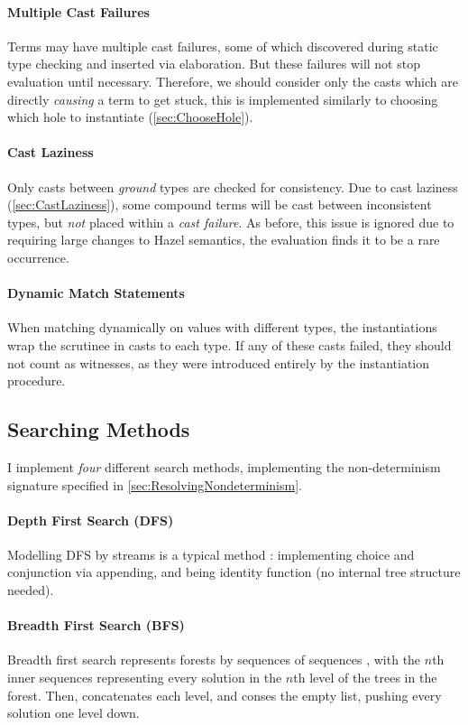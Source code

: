 \paragraph{Multiple Cast Failures} Terms may have multiple cast failures, some of which discovered during static type checking and inserted via elaboration. But these failures will not stop evaluation until necessary. Therefore, we should consider only the casts which are directly \textit{causing} a term to get stuck, this is implemented similarly to choosing which hole to instantiate (\cref{sec:ChooseHole}).

\paragraph{Cast Laziness}
\label{sec:SearchCastLaziness}
Only casts between \textit{ground} types are checked for consistency. Due to cast laziness (\cref{sec:CastLaziness}), some compound terms will be cast between inconsistent types, but \textit{not} placed within a \textit{cast failure}. As before, this issue is ignored due to requiring large changes to Hazel semantics, the evaluation finds it to be a rare occurrence.

\paragraph{Dynamic Match Statements} When matching dynamically on values with different types, the instantiations wrap the scrutinee in casts to each type. If any of these casts failed, they should not count as witnesses, as they were introduced entirely by the instantiation procedure. 

\subsection{Searching Methods}\label{sec:SearchMethods}
I implement \textit{four} different search methods, implementing the non-determinism signature specified in \cref{sec:ResolvingNondeterminism}.

\paragraph{Depth First Search (DFS)}
Modelling DFS by streams is a typical method \cite{ListOfSuccess}: implementing choice and conjunction via appending, and  being identity function (no internal tree structure needed).

\paragraph{Breadth First Search (BFS)}
Breadth first search represents forests by sequences of sequences \cite{BFSCombinators}, with the $n$th inner sequences representing every solution in the $n$th level of the trees in the forest. Then,  concatenates each level, and  conses the empty list, pushing every solution one level down.

